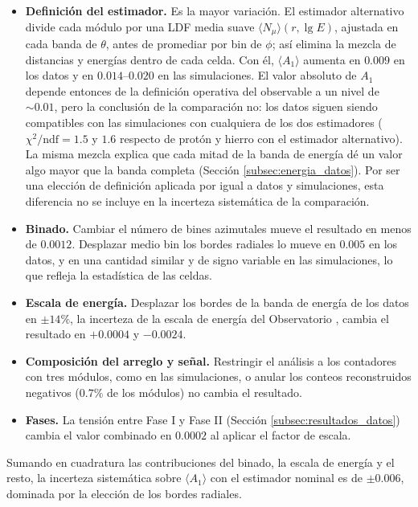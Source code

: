 \begin{itemize}
	\item \textbf{Definición del estimador.} Es la mayor variación. El estimador alternativo divide cada módulo por una LDF media suave $\langle N_\mu \rangle(r, \lg E)$, ajustada en cada banda de $\theta$, antes de promediar por bin de $\phi$; así elimina la mezcla de distancias y energías dentro de cada celda. Con él, $\langle A_1 \rangle$ aumenta en $0.009$ en los datos y en $0.014$--$0.020$ en las simulaciones. El valor absoluto de $A_1$ depende entonces de la definición operativa del observable a un nivel de $\sim 0.01$, pero la conclusión de la comparación no: los datos siguen siendo compatibles con las simulaciones con cualquiera de los dos estimadores ($\chi^2/\mathrm{ndf} = 1.5$ y $1.6$ respecto de protón y hierro con el estimador alternativo). La misma mezcla explica que cada mitad de la banda de energía dé un valor algo mayor que la banda completa (Sección \ref{subsec:energia_datos}). Por ser una elección de definición aplicada por igual a datos y simulaciones, esta diferencia no se incluye en la incerteza sistemática de la comparación.
	\item \textbf{Binado.} Cambiar el número de bines azimutales mueve el resultado en menos de $0.0012$. Desplazar medio bin los bordes radiales lo mueve en $0.005$ en los datos, y en una cantidad similar y de signo variable en las simulaciones, lo que refleja la estadística de las celdas.
	\item \textbf{Escala de energía.} Desplazar los bordes de la banda de energía de los datos en $\pm 14\%$, la incerteza de la escala de energía del Observatorio \cite{augerSpectrum2020}, cambia el resultado en $+0.0004$ y $-0.0024$.
	\item \textbf{Composición del arreglo y señal.} Restringir el análisis a los contadores con tres módulos, como en las simulaciones, o anular los conteos reconstruidos negativos ($0.7\%$ de los módulos) no cambia el resultado.
	\item \textbf{Fases.} La tensión entre Fase I y Fase II (Sección \ref{subsec:resultados_datos}) cambia el valor combinado en $0.0002$ al aplicar el factor de escala.
\end{itemize}

Sumando en cuadratura las contribuciones del binado, la escala de energía y el resto, la incerteza sistemática sobre $\langle A_1 \rangle$ con el estimador nominal es de $\pm 0.006$, dominada por la elección de los bordes radiales.

